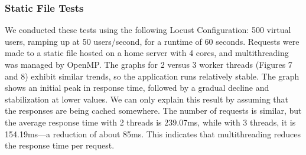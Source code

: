 \subsubsection*{Static File Tests}
We conducted these tests using the following Locust Configuration: 500 virtual users, ramping up at 50 users/second, for a runtime of 60 seconds. Requests were made to a static file hosted on a home server with 4 cores, and multithreading was managed by OpenMP.
The graphs for 2 versus 3 worker threads (Figures 7 and 8) exhibit similar trends, so the application runs relatively stable. The graph shows an initial peak in response time, followed by a gradual decline and stabilization at lower values. We can only explain this result by assuming that the responses are being cached somewhere.
The number of requests is similar, but the average response time with 2 threads is 239.07ms, while with 3 threads, it is 154.19ms—a reduction of about 85ms. This indicates that multithreading reduces the response time per request.
